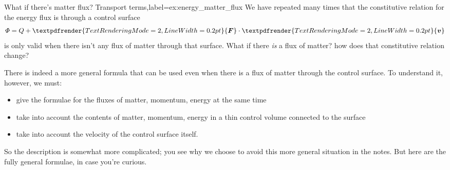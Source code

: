 \documentclass[a4paper,12pt,%
onecolumn,oneside,%
british%
]{memoir}
\renewcommand*{\bm}[1]{\textpdfrender{TextRenderingMode=2,LineWidth=0.2pt}{\boldsymbol{#1}}}
\renewcommand*{\|}[1][]{\nonscript\:#1\vert\nonscript\:\mathopen{}}
\newcommand*{\yv}{\bm{v}}
\newcommand*{\yH}{\varPhi}%
\newcommand*{\yQ}{Q}%
\newcommand*{\yF}{\bm{F}}
\begin{document}
\begin{extra}{What if there's matter flux? Transport terms,label={ex:energy_matter_flux}}
  We have repeated many times that the constitutive relation for the energy flux is through a control surface
  \begin{equation*}
    \yH = \yQ + \yF\cdot\yv
  \end{equation*}
  is only valid when there isn't any flux of matter through that surface. What if there \emph{is} a flux of matter? how does that constitutive relation change?

  There is indeed a more general formula that can be used even when there is a flux of matter through the control surface. To understand it, however, we must:
  \begin{itemize}[nosep]
  \item give the formulae for the fluxes of matter, momentum, energy at the same time
  \item take into account the contents of matter, momentum, energy in a thin control volume connected to the surface
  \item take into account the velocity of the control surface itself.
  \end{itemize}
So the description is somewhat more complicated; you see why we choose to avoid this more general situation in the notes. But here are the fully general formulae, in case you're curious.


\end{extra}
\end{document}
